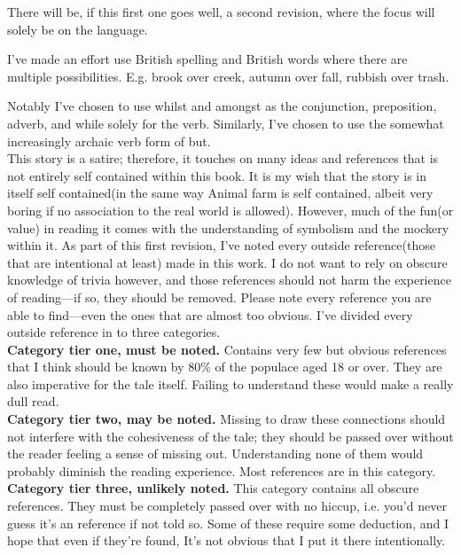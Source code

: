 \documentclass[smalldemyvopaper,11pt,twoside,onecolumn,openright,extrafontsizes]{memoir}
\begin{document}
There will be, if this first one goes well, a second revision, where the focus will solely be on the language.

I've made an effort use British spelling and British words where there are multiple possibilities. E.g. brook over creek, autumn over fall, rubbish over trash.

Notably I've chosen to use whilst and amongst as the conjunction, preposition, adverb, and while solely for the verb. Similarly, I've chosen to use the somewhat increasingly archaic verb form of but. \\

This story is a satire; therefore, it touches on many ideas and references that is not entirely self contained within this book. It is my wish that the story is in itself self contained(in the same way Animal farm is self contained, albeit very boring if no association to the real world is allowed). However, much of the fun(or value) in reading it comes with the understanding of symbolism and the mockery within it. 
As part of this first revision, I've noted every outside reference(those that are intentional at least) made in this work. I do not want to rely on obscure knowledge of trivia however, and those references should not harm the experience of reading---if so, they should be removed. Please note every reference you are able to find---even the ones that are almost too obvious.
I've divided every outside reference in to three categories.\\[1cm]

\textbf{Category tier one, must be noted.}
Contains very few but obvious references that I think should be known by 80\% of the populace aged 18 or over. They are also imperative for the tale itself. Failing to understand these would make a really dull read.\\[1cm]

\textbf{Category tier two, may be noted.}
Missing to draw these connections should not interfere with the cohesiveness of the tale; they should be passed over without the reader feeling a sense of missing out. Understanding none of them would probably diminish the reading experience.
Most references are in this category.\\[1cm]
 
\textbf{Category tier three, unlikely noted.} 
This category contains all obscure references. They must be completely passed over with no hiccup, i.e. you'd never guess it's an reference if not told so. Some of these require some deduction, and I hope that even if they're found, It's not obvious that I put it there intentionally.
\end{document}
